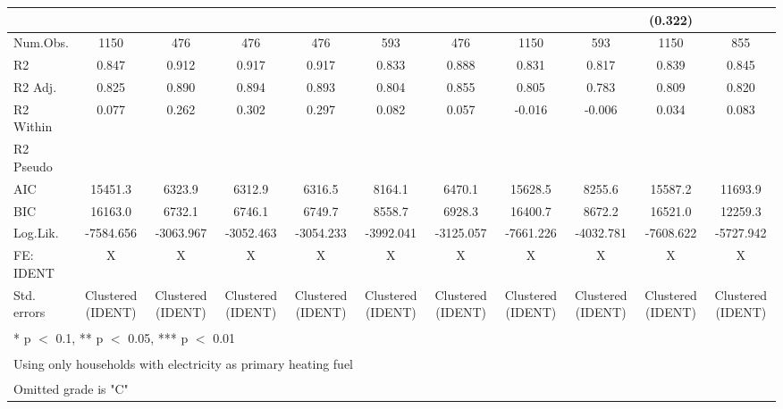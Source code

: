 \documentclass[
]{article}
\begin{document}
\begin{table}
{\begin{tabular}[t]{lcccccccccc}
 &  &  &  &  &  &  &  &  & (0.322) & \\
\midrule
Num.Obs. & 1150 & 476 & 476 & 476 & 593 & 476 & 1150 & 593 & 1150 & 855\\
R2 & 0.847 & 0.912 & 0.917 & 0.917 & 0.833 & 0.888 & 0.831 & 0.817 & 0.839 & 0.845\\
R2 Adj. & 0.825 & 0.890 & 0.894 & 0.893 & 0.804 & 0.855 & 0.805 & 0.783 & 0.809 & 0.820\\
R2 Within & 0.077 & 0.262 & 0.302 & 0.297 & 0.082 & 0.057 & -0.016 & -0.006 & 0.034 & 0.083\\
R2 Pseudo &  &  &  &  &  &  &  &  &  & \\
AIC & 15451.3 & 6323.9 & 6312.9 & 6316.5 & 8164.1 & 6470.1 & 15628.5 & 8255.6 & 15587.2 & 11693.9\\
BIC & 16163.0 & 6732.1 & 6746.1 & 6749.7 & 8558.7 & 6928.3 & 16400.7 & 8672.2 & 16521.0 & 12259.3\\
Log.Lik. & -7584.656 & -3063.967 & -3052.463 & -3054.233 & -3992.041 & -3125.057 & -7661.226 & -4032.781 & -7608.622 & -5727.942\\
FE: IDENT & X & X & X & X & X & X & X & X & X & X\\
Std. errors & Clustered (IDENT) & Clustered (IDENT) & Clustered (IDENT) & Clustered (IDENT) & Clustered (IDENT) & Clustered (IDENT) & Clustered (IDENT) & Clustered (IDENT) & Clustered (IDENT) & Clustered (IDENT)\\
\bottomrule
\multicolumn{11}{l}{\textsuperscript{} * p $<$ 0.1, ** p $<$ 0.05, *** p $<$ 0.01}\\
\multicolumn{11}{l}{\textsuperscript{} Using only households with electricity as primary heating fuel}\\
\multicolumn{11}{l}{\textsuperscript{} Omitted grade is "C"}\\
\end{tabular}}
\end{table}
\end{document}

